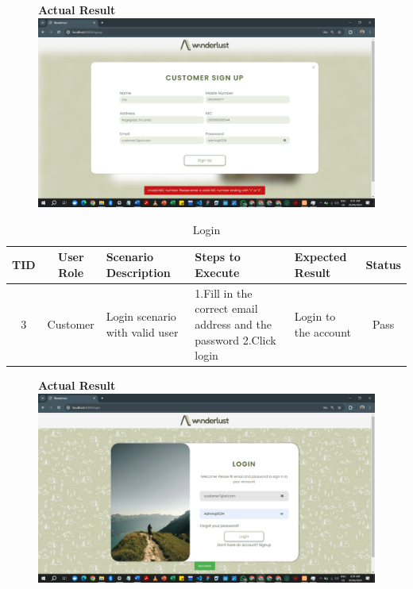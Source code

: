 \begin{figure}[h!]
    \centering
    \textbf{Actual Result}
    \includegraphics[width=1\textwidth]{Images/Test Cases/2. invalid acc create.png}
\end{figure}
\clearpage


\begin{table}[ht]
\centering
\begin{tabularx}{\textwidth}{|c|c|X|X|X|c|}
\hline
\textbf{TID} & \textbf{User Role} & \textbf{Scenario Description} & \textbf{Steps to Execute} & \textbf{Expected Result} & \textbf{Status} \\ \hline
3 & Customer & Login scenario with valid user & 1.Fill in the correct email address and the password \newline 2.Click login & Login to the account & Pass \\ \hline
\end{tabularx}
\caption{Login}
\end{table}

\begin{figure}[h!]
    \centering
    \textbf{Actual Result}
    \includegraphics[width=1\textwidth]{Images/Test Cases/3. valid login.png}
\end{figure}
\clearpage


